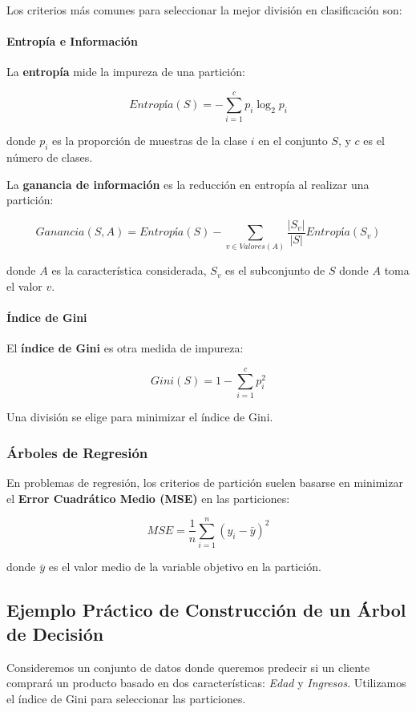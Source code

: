 \documentclass[a4paper, 11pt]{article}
\begin{document}
Los criterios más comunes para seleccionar la mejor división en clasificación son:

\paragraph{Entropía e Información}

La \textbf{entropía} mide la impureza de una partición:

\[
Entropía(S) = -\sum_{i=1}^{c} p_i \log_2 p_i
\]

donde $p_i$ es la proporción de muestras de la clase $i$ en el conjunto $S$, y $c$ es el número de clases.

La \textbf{ganancia de información} es la reducción en entropía al realizar una partición:

\[
Ganancia(S, A) = Entropía(S) - \sum_{v \in Valores(A)} \frac{|S_v|}{|S|} Entropía(S_v)
\]

donde $A$ es la característica considerada, $S_v$ es el subconjunto de $S$ donde $A$ toma el valor $v$.

\paragraph{Índice de Gini}

El \textbf{índice de Gini} es otra medida de impureza:

\[
Gini(S) = 1 - \sum_{i=1}^{c} p_i^2
\]

Una división se elige para minimizar el índice de Gini.

\subsubsection{Árboles de Regresión}

En problemas de regresión, los criterios de partición suelen basarse en minimizar el \textbf{Error Cuadrático Medio (MSE)} en las particiones:

\[
MSE = \frac{1}{n} \sum_{i=1}^{n} (y_i - \bar{y})^2
\]

donde $\bar{y}$ es el valor medio de la variable objetivo en la partición.

\subsection{Ejemplo Práctico de Construcción de un Árbol de Decisión}

Consideremos un conjunto de datos donde queremos predecir si un cliente comprará un producto basado en dos características: \textit{Edad} y \textit{Ingresos}. Utilizamos el índice de Gini para seleccionar las particiones.
\end{document}

